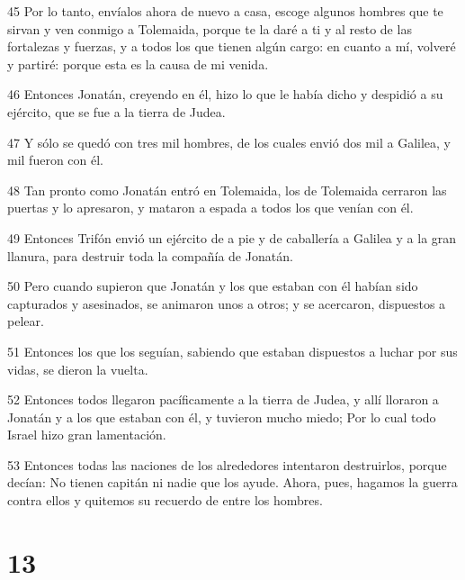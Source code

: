 \par 45 Por lo tanto, envíalos ahora de nuevo a casa, escoge algunos hombres que te sirvan y ven conmigo a Tolemaida, porque te la daré a ti y al resto de las fortalezas y fuerzas, y a todos los que tienen algún cargo: en cuanto a mí, volveré y partiré: porque esta es la causa de mi venida.
\par 46 Entonces Jonatán, creyendo en él, hizo lo que le había dicho y despidió a su ejército, que se fue a la tierra de Judea.
\par 47 Y sólo se quedó con tres mil hombres, de los cuales envió dos mil a Galilea, y mil fueron con él.
\par 48 Tan pronto como Jonatán entró en Tolemaida, los de Tolemaida cerraron las puertas y lo apresaron, y mataron a espada a todos los que venían con él.
\par 49 Entonces Trifón envió un ejército de a pie y de caballería a Galilea y a la gran llanura, para destruir toda la compañía de Jonatán.
\par 50 Pero cuando supieron que Jonatán y los que estaban con él habían sido capturados y asesinados, se animaron unos a otros; y se acercaron, dispuestos a pelear.
\par 51 Entonces los que los seguían, sabiendo que estaban dispuestos a luchar por sus vidas, se dieron la vuelta.
\par 52 Entonces todos llegaron pacíficamente a la tierra de Judea, y allí lloraron a Jonatán y a los que estaban con él, y tuvieron mucho miedo; Por lo cual todo Israel hizo gran lamentación.
\par 53 Entonces todas las naciones de los alrededores intentaron destruirlos, porque decían: No tienen capitán ni nadie que los ayude. Ahora, pues, hagamos la guerra contra ellos y quitemos su recuerdo de entre los hombres.

\chapter{13}

